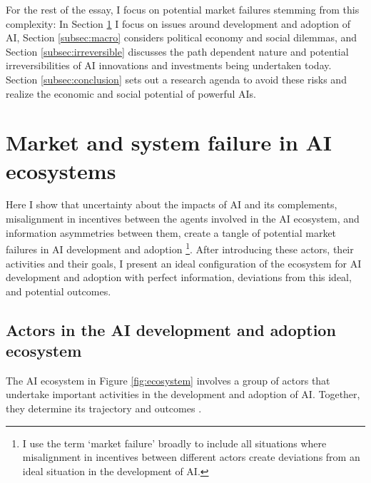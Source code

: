 \documentclass[11pt]{article}
\begin{document}
For the rest of the essay, I focus on potential market failures stemming from this complexity: In Section \ref{sec:micro} I focus on issues around development and adoption of AI, Section \ref{subsec:macro} considers political economy and social dilemmas, and Section \ref{subsec:irreversible} discusses the path dependent nature and potential irreversibilities of AI innovations and investments being undertaken today. Section \ref{subsec:conclusion} sets out a research agenda to avoid these risks and realize the economic and social potential of powerful AIs.

\section{Market and system failure in AI ecosystems}
\label{sec:micro}
Here I show that uncertainty about the impacts of AI and its complements, misalignment in incentives between the agents involved in the AI ecosystem, and information asymmetries between them, create a tangle of potential market failures in AI development and adoption \footnote{I use the term `market failure' broadly to include all situations where misalignment in incentives between different actors create deviations from an ideal situation in the development of AI.}. After introducing these actors, their activities and their goals, I present an ideal configuration of the ecosystem for AI development and adoption with perfect information, deviations from this ideal, and potential outcomes.

\subsection{Actors in the AI development and adoption ecosystem}
The AI ecosystem in Figure \ref{fig:ecosystem} involves a group of actors that undertake important activities in the development and adoption of AI. Together, they determine its trajectory and outcomes .
\end{document}

